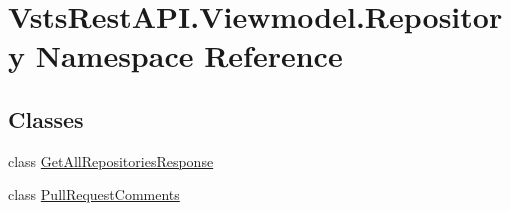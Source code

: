\hypertarget{namespace_vsts_rest_a_p_i_1_1_viewmodel_1_1_repository}{}\section{Vsts\+Rest\+A\+P\+I.\+Viewmodel.\+Repository Namespace Reference}
\label{namespace_vsts_rest_a_p_i_1_1_viewmodel_1_1_repository}
\subsection*{Classes}
\begin{DoxyCompactItemize}
\item 
class \mbox{\hyperlink{class_vsts_rest_a_p_i_1_1_viewmodel_1_1_repository_1_1_get_all_repositories_response}{Get\+All\+Repositories\+Response}}
\item 
class \mbox{\hyperlink{class_vsts_rest_a_p_i_1_1_viewmodel_1_1_repository_1_1_pull_request_comments}{Pull\+Request\+Comments}}
\end{DoxyCompactItemize}
